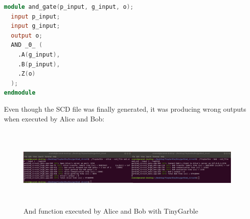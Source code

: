 \begin{refsection}
\newpage

\begin{lstlisting}[caption={and\_gate\_netlist\_fix.v}, language=Verilog] 
module and_gate(p_input, g_input, o);
  input p_input;
  input g_input;
  output o;
  AND _0_ (
    .A(g_input),
    .B(p_input),
    .Z(o)
  );
endmodule
\end{lstlisting}

Even though the SCD file was finally generated, it was producing wrong outputs when executed by Alice and Bob:

\begin{figure}[H]
	\centering
	\includegraphics[width=1\textwidth, height=4cm]{./sdf/secure_multiparty_computation/figures/tinygarble_terminal.png}
    \caption{And function executed by Alice and Bob with TinyGarble}\label{fig:tinygarble_terminal}
\end{figure}

\clearpage
\printbibliography[heading=subbibliography]
\end{refsection}
\cleardoublepage
